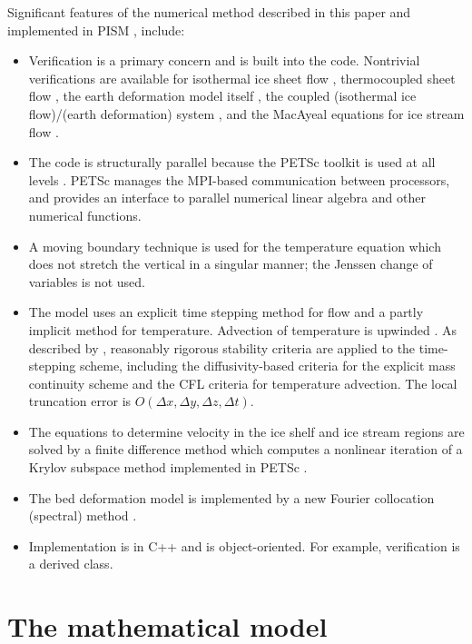 \documentclass[12pt,final]{amsart}%
\theoremstyle{plain}
\theoremstyle{definition}
\theoremstyle{remark}
\begin{document}
Significant features of the numerical method described in this paper and implemented in PISM \citep{pism-web-page}, include:\begin{itemize}
\item Verification \citep{Roache} is a primary concern and is built into the code.  Nontrivial verifications are available for isothermal ice sheet flow \citep{BLKCB}, thermocoupled sheet flow \citep{BB,BBL}, the earth deformation model itself \citep{BLKfastearth}, the coupled (isothermal ice flow)/(earth deformation) system \citep{BLKfastearth}, and the MacAyeal equations for ice stream flow \citep{BrownPresentation}.
\item The code is structurally parallel because the PETSc toolkit is used at all levels \citep{petsc-web-page,petsc-user-ref}.  PETSc manages the MPI-based communication between processors, and provides an interface to parallel numerical linear algebra and other numerical functions.
\item A moving boundary technique is used for the temperature equation which does not stretch the vertical in a singular manner; the Jenssen \citep{Jenssen} change of variables is not used.
\item The model uses an explicit time stepping method for flow and a partly implicit method for temperature.  Advection of temperature is upwinded \citep{MortonMayers}.  As described by  \citet{BBL}, reasonably rigorous stability criteria are applied to the time-stepping scheme, including the diffusivity-based criteria for the explicit mass continuity scheme and the CFL criteria \citep{MortonMayers} for temperature advection.  The local truncation error is $O(\Delta x,\Delta y,\Delta z,\Delta t)$.
\item The equations to determine velocity in the ice shelf and ice stream regions are solved by a finite difference method which computes a nonlinear iteration of a Krylov subspace method implemented in PETSc \citep{BrownPresentation,petsc-web-page,petsc-user-ref}.
\item The bed deformation model is implemented by a new Fourier collocation (spectral) method \citep{BLKfastearth}.
\item Implementation is in C++ and is object-oriented.  For example, verification is a derived class.
\end{itemize}


\newpage
\section{The mathematical model}
\label{mathmodelsect}
\end{document}
